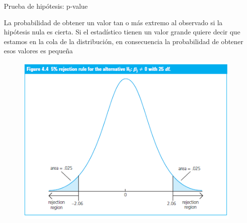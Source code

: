 \documentclass{beamer}
\begin{document}
\begin{frame}{Prueba de hipótesis: p-value}

La probabilidad de obtener un valor tan o más extremo al observado si la hipótesis nula es cierta. Si el estadístico tienen un valor grande quiere decir que estamos en la cola de la distribución, en consecuencia la probabilidad de obtener esos valores es pequeña
\begin{figure}
\centering
        \includegraphics[scale=0.5]{twotailed.PNG}
        
        \end{figure}

    
\end{frame}

\printbibliography
\end{document}
